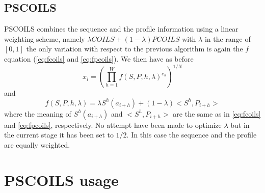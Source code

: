 \documentclass[11pt,english]{article}
\begin{document}
\subsection{PSCOILS}
PSCOILS combines the sequence and the profile information using a linear 
weighting scheme, namely $\lambda COILS + (1-\lambda)PCOILS$ with $\lambda$
in the range of $[0,1]$ the only variation with respect to the previous algorithm
is again the $f$ equation (\ref{eq:fcoils} and \ref{eq:fpcoils}). We then have
as before
\begin{equation}
x_i=(\prod_{h=1}^W f(S,P,h,\lambda)^{e_h})^{1/N}
\label{eq:prodpscoils}
\end{equation}
and
\begin{equation}
f(S,P,h,\lambda)=\lambda S^h(a_{i+h}) + (1-\lambda) <S^h,P_{i+h}>
\label{eq:fpscoils}
\end{equation}
where the meaning of $S^h(a_{i+h})$  and $<S^h,P_{i+h}>$ are the same as in
\ref{eq:fcoils} and \ref{eq:fpcoils}, respectively. 
No attempt have been made to optimize $\lambda$ but in the current stage it has
been set to $1/2$. In this case the sequence and the profile are equally weighted.


\section{PSCOILS usage}
\end{document}
